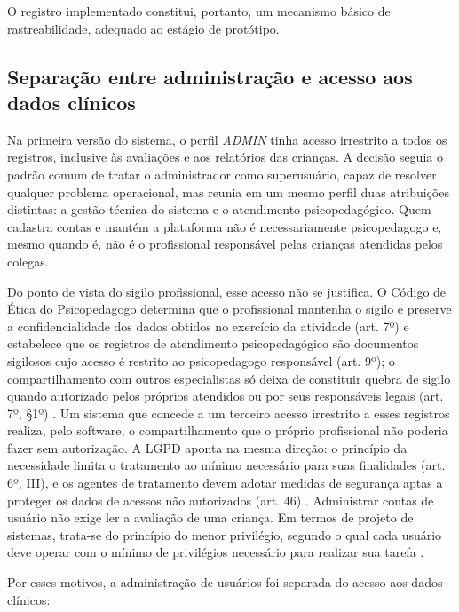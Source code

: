 O registro implementado constitui, portanto, um mecanismo básico de rastreabilidade, adequado ao estágio de protótipo.

\subsection{Separação entre administração e acesso aos dados clínicos}\label{sec:separacao_admin}

Na primeira versão do sistema, o perfil \textit{ADMIN} tinha acesso irrestrito a todos os registros, inclusive às avaliações e aos relatórios das crianças. A decisão seguia o padrão comum de tratar o administrador como superusuário, capaz de resolver qualquer problema operacional, mas reunia em um mesmo perfil duas atribuições distintas: a gestão técnica do sistema e o atendimento psicopedagógico. Quem cadastra contas e mantém a plataforma não é necessariamente psicopedagogo e, mesmo quando é, não é o profissional responsável pelas crianças atendidas pelos colegas.

Do ponto de vista do sigilo profissional, esse acesso não se justifica. O Código de Ética do Psicopedagogo determina que o profissional mantenha o sigilo e preserve a confidencialidade dos dados obtidos no exercício da atividade (art. 7º) e estabelece que os registros de atendimento psicopedagógico são documentos sigilosos cujo acesso é restrito ao psicopedagogo responsável (art. 9º); o compartilhamento com outros especialistas só deixa de constituir quebra de sigilo quando autorizado pelos próprios atendidos ou por seus responsáveis legais (art. 7º, §1º) \cite{abpp2019_codigo_etica}. Um sistema que concede a um terceiro acesso irrestrito a esses registros realiza, pelo software, o compartilhamento que o próprio profissional não poderia fazer sem autorização. A LGPD aponta na mesma direção: o princípio da necessidade limita o tratamento ao mínimo necessário para suas finalidades (art. 6º, III), e os agentes de tratamento devem adotar medidas de segurança aptas a proteger os dados de acessos não autorizados (art. 46) \cite{brasil2018_lgpd}. Administrar contas de usuário não exige ler a avaliação de uma criança. Em termos de projeto de sistemas, trata-se do princípio do menor privilégio, segundo o qual cada usuário deve operar com o mínimo de privilégios necessário para realizar sua tarefa \cite{saltzer1975_protection}.

Por esses motivos, a administração de usuários foi separada do acesso aos dados clínicos:

